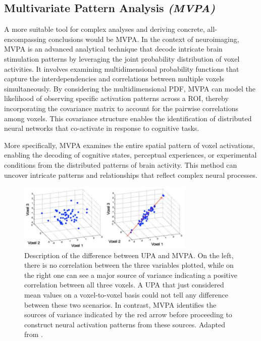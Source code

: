 \subsection{Multivariate Pattern Analysis \textit{(MVPA)}}

A more suitable tool for complex analyses and deriving concrete, all-encompassing conclusions would be \gls{MVPA}. In the context of neuroimaging, \gls{MVPA} is an advanced analytical technique that decode intricate brain stimulation patterns by leveraging the joint probability distribution of voxel activities. It involves examining multidimensional probability functions that capture the interdependencies and correlations between multiple voxels simultaneously. By considering the multidimensional \gls{PDF}, MVPA can model the likelihood of observing specific activation patterns across a \gls{ROI}, thereby incorporating the covariance matrix to account for the pairwise correlations among voxels. This covariance structure enables the identification of distributed neural networks that co-activate in response to cognitive tasks.

More specifically, \gls{MVPA} examines the entire spatial pattern of voxel activations, enabling the decoding of cognitive states, perceptual experiences, or experimental conditions from the distributed patterns of brain activity. This method can uncover intricate patterns and relationships that reflect complex neural processes.

\begin{figure}[htbp]
    \centering
    \includegraphics[width = 0.75\textwidth]{assets/images/Uni_vs_Multi.png}
    \caption[Illustration of the Difference Between MVPA and UPA]{Description of the difference between \gls{UPA} and \gls{MVPA}. On the left, there is no correlation between the three variables plotted, while on the right one can see a major source of variance indicating a positive correlation between all three voxels. A \gls{UPA} that just considered mean values on a voxel-to-voxel basis could not tell any difference between these two scenarios. In contrast, \gls{MVPA} identifies the sources of variance indicated by the red arrow before proceeding to construct neural activation patterns from these sources. Adapted from .}
    \label{fig:UvsM}
\end{figure}

